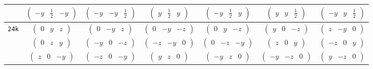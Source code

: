 \documentclass[fleqn,9pt,landscape]{jsarticle}
\begin{document}
\begin{center}
\begin{longtable}{ccccccc}
& $ \begin{pmatrix} - y & \frac{1}{2} & - y \end{pmatrix} $ & $ \begin{pmatrix} - y & - y & \frac{1}{2} \end{pmatrix} $ & $ \begin{pmatrix} y & \frac{1}{2} & y \end{pmatrix} $ & $ \begin{pmatrix} - y & \frac{1}{2} & y \end{pmatrix} $ & $ \begin{pmatrix} y & y & \frac{1}{2} \end{pmatrix} $ & $ \begin{pmatrix} - y & y & \frac{1}{2} \end{pmatrix} $ \\ \hline
{\tt 24k} & $ \begin{pmatrix} 0 & y & z \end{pmatrix} $ & $ \begin{pmatrix} 0 & - y & z \end{pmatrix} $ & $ \begin{pmatrix} 0 & - y & - z \end{pmatrix} $ & $ \begin{pmatrix} 0 & y & - z \end{pmatrix} $ & $ \begin{pmatrix} y & 0 & - z \end{pmatrix} $ & $ \begin{pmatrix} z & - y & 0 \end{pmatrix} $ \\
& $ \begin{pmatrix} 0 & z & y \end{pmatrix} $ & $ \begin{pmatrix} - y & 0 & - z \end{pmatrix} $ & $ \begin{pmatrix} - z & - y & 0 \end{pmatrix} $ & $ \begin{pmatrix} 0 & - z & - y \end{pmatrix} $ & $ \begin{pmatrix} z & 0 & y \end{pmatrix} $ & $ \begin{pmatrix} - z & 0 & y \end{pmatrix} $ \\
& $ \begin{pmatrix} z & 0 & - y \end{pmatrix} $ & $ \begin{pmatrix} - z & 0 & - y \end{pmatrix} $ & $ \begin{pmatrix} y & z & 0 \end{pmatrix} $ & $ \begin{pmatrix} - y & z & 0 \end{pmatrix} $ & $ \begin{pmatrix} - y & - z & 0 \end{pmatrix} $ & $ \begin{pmatrix} y & - z & 0 \end{pmatrix} $ \\

\end{longtable}
\end{center}
\end{document}
